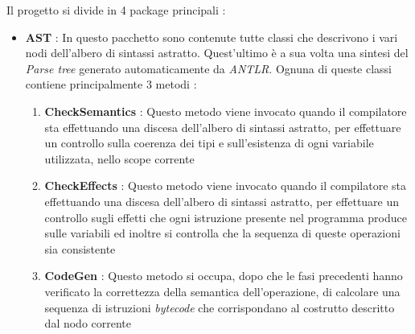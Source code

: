 \documentclass{article}
\begin{document}
 Il progetto si divide in 4 package principali : 
 \begin{itemize}
     \item \textbf{AST} : In questo pacchetto sono contenute tutte classi che descrivono i vari nodi dell'albero di sintassi astratto. Quest'ultimo è a sua volta una sintesi del \textit{Parse tree} generato automaticamente da \textit{ANTLR}. Ognuna di queste classi contiene principalmente 3 metodi :
     \begin{enumerate}
         \item \textbf{CheckSemantics} : Questo metodo viene invocato quando il compilatore sta effettuando una discesa dell'albero di sintassi astratto, per effettuare un controllo sulla coerenza dei tipi e sull'esistenza di ogni variabile utilizzata, nello scope corrente
         \item \textbf{CheckEffects} : Questo metodo viene invocato quando il compilatore sta effettuando una discesa dell'albero di sintassi astratto, per effettuare un controllo sugli effetti che ogni istruzione presente nel programma produce sulle variabili ed inoltre si controlla che la sequenza di queste operazioni sia consistente
         \item \textbf{CodeGen} : Questo metodo si occupa, dopo che le fasi precedenti hanno verificato la correttezza della semantica dell'operazione, di calcolare una sequenza di istruzioni \textit{bytecode} che corrispondano al costrutto descritto dal nodo corrente
     \end{enumerate}
     

\end{itemize}
\end{document}
